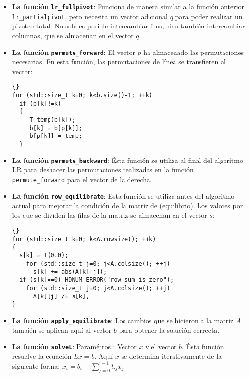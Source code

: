 \documentclass[a4paper,11pt]{article}
\theoremstyle{definition}
\begin{document}
\begin{itemize}
\item  \textbf{La función \lstinline{lr_fullpivot}}: Funciona de manera similar a la función 
  anterior \lstinline{lr_partialpivot}, pero necesita un vector adicional $q$ para poder realizar un pivoteo total. 
  No solo es posible intercambiar filas, sino también intercambiar columnas, 
  que se almacenan en el vector $q$.

\item \textbf{La función \lstinline{permute_forward}}: 
  El vector $p$ ha almacenado las permutaciones necesarias. En esta función, las permutaciones 
  de línea se transfieren al vector:

{\footnotesize{\begin{lstlisting}{}
for (std::size_t k=0; k<b.size()-1; ++k)
  if (p[k]!=k)
  {
     T temp(b[k]);
     b[k] = b[p[k]];
     b[p[k]] = temp;
  }
\end{lstlisting}}}

\item \textbf{La función \lstinline{permute_backward}}: 
  Ésta función se utiliza al final del algorítmo LR para deshacer las permutaciones 
  realizadas en la función \lstinline{permute_forward} para el vector de la derecha.

\item \textbf{La función \lstinline{row_equilibrate}}: 
  Esta función se utiliza antes del algoritmo actual para mejorar la condición de la matriz de 
  (equilibrio). Los valores por los que se dividen las filas de la matriz se almacenan en el vector $s$:

{\footnotesize{\begin{lstlisting}{}
for (std::size_t k=0; k<A.rowsize(); ++k)
{
  s[k] = T(0.0);
    for (std::size_t j=0; j<A.colsize(); ++j)
      s[k] += abs(A[k][j]);
  if (s[k]==0) HDNUM_ERROR("row sum is zero");
    for (std::size_t j=0; j<A.colsize(); ++j)
      A[k][j] /= s[k];
}
\end{lstlisting}}}


\item \textbf{La función \lstinline{apply_equilibrate}}: 
  Los cambios que se hicieron a la matriz $A$ también se aplican aquí al vector $b$ 
  para obtener la solución correcta.

\item \textbf{La función \lstinline{solveL}}: Paramétros : Vector $x$
  y el vector  $b$.  Ésta función resuelve la ecuación $Lx=b$. Aquí $x$ se 
  determina iterativamente de la siguiente forma:
  $x_i= b_i - \sum_{j=0}^{i-1} l_{ij}x_j$


\end{itemize}
\end{document}

